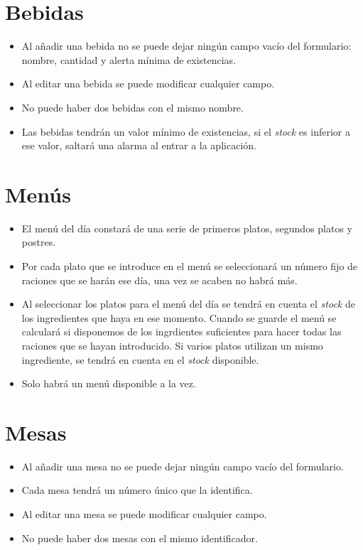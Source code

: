 \section{Bebidas}

\begin{itemize}
\item Al añadir una bebida no se puede dejar ningún campo vacío del formulario: nombre, cantidad y alerta mínima de existencias.
\item Al editar una bebida se puede modificar cualquier campo.
\item No puede haber dos bebidas con el mismo nombre.
\item Las bebidas tendrán un valor mínimo de existencias, si el \textit{stock} es inferior a ese valor, saltará una alarma al entrar a la aplicación.

\end{itemize}

\section{Menús}

\begin{itemize}
\item El menú del día constará de una serie de primeros platos, segundos platos y postres.

\item Por cada plato que se introduce en el menú se seleccionará un número fijo de raciones que se harán ese día, una vez se acaben no habrá más.

\item Al seleccionar los platos para el menú del día se tendrá en cuenta el \textit{stock} de los ingredientes que haya en ese momento. Cuando se guarde el menú se calculará si disponemos de los ingrdientes suficientes para hacer todas las raciones que se hayan introducido. Si varios platos utilizan un mismo ingrediente, se tendrá en cuenta en el \textit{stock} disponible.

\item Solo habrá un menú disponible a la vez.

\end{itemize}

\section{Mesas}

\begin{itemize}
\item Al añadir una mesa no se puede dejar ningún campo vacío del formulario.
\item Cada mesa tendrá un número único que la identifica.
\item Al editar una mesa se puede modificar cualquier campo.
\item No puede haber dos mesas con el mismo identificador.

\end{itemize}

